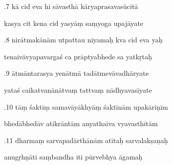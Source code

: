 \documentclass[article,12pt,a4paper]{memoir}%
\newcounter{parCount}
\begin{document}
	  
	  \pstart {}.7 kā cid eva hi sāvasthā kāryaprasavasūcitā 
	{}
	\pend%
      

	  
	  \pstart \leavevmode%
	kasya cit kena cid yasyāṃ saṃyoga upajāyate 
	{}
	\pend%
      

	  
	  \pstart {}.8 nirātmakānām utpattau niyamaḥ kva cid eva yaḥ 
	{}
	\pend%
      

	  
	  \pstart \leavevmode%
	tenaivāvyapavargaś ca prāptyabhede sa yatkṛtaḥ 
	{}
	\pend%
      

	  
	  \pstart {}.9 ātmāntarasya yenātmā tadātmevāvadhāryate 
	{}
	\pend%
      

	  
	  \pstart \leavevmode%
	yataś caikatvanānātvaṃ tattvaṃ nādhyavasīyate 
	{}
	\pend%
      

	  
	  \pstart {}.10 tāṃ śaktiṃ samavāyākhyāṃ śaktīnām upakāriṇīm 
	{}
	\pend%
      

	  
	  \pstart \leavevmode%
	bhedābhedāv atikrāntām anyathaiva vyavasthitām 
	{}
	\pend%
      

	  
	  \pstart {}.11 dharmaṃ sarvapadārthānām atītaḥ sarvalakṣaṇaḥ 
	{}
	\pend%
      

	  
	  \pstart \leavevmode%
	anugṛhṇāti saṃbandha iti pūrvebhya āgamaḥ 
	{}
	\pend%
      
\end{document}
